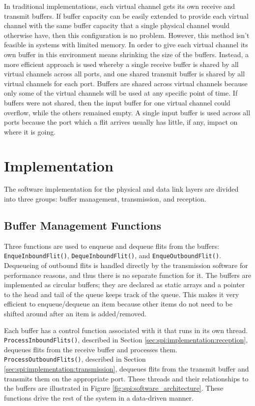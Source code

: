In traditional implementations, each virtual channel gets its own receive and transmit buffers. If buffer capacity can be easily extended to provide each virtual channel with the same buffer capacity that a single physical channel would otherwise have, then this configuration is no problem. However, this method isn't feasible in systems with limited memory. In order to give each virtual channel its own buffer in this environment means shrinking the size of the buffers. Instead, a more efficient approach is used whereby a single receive buffer is shared by all virtual channels across all ports, and one shared transmit buffer is shared by all virtual channels for each port. Buffers are shared across virtual channels because only some of the virtual channels will be used at any specific point of time. If buffers were not shared, then the input buffer for one virtual channel could overflow, while the others remained empty. A single input buffer is used across all ports because the port which a flit arrives usually has little, if any, impact on where it is going.

\section{Implementation}\label{sec:spi:implementation}

The software implementation for the physical and data link layers are divided into three groups: buffer management, transmission, and reception.

\subsection{Buffer Management Functions}\label{sec:spi:implementation:buffer_management_functions}

Three functions are used to enqueue and dequeue flits from the buffers: \lstinline$EnqueInboundFlit()$, \lstinline$DequeInboundFlit()$, and \lstinline$EnqueOutboundFlit()$. Dequeueing of outbound flits is handled directly by the transmission software for performance reasons, and thus there is no separate function for it. The buffers are implemented as circular buffers; they are declared as static arrays and a pointer to the head and tail of the queue keeps track of the queue. This makes it very efficient to enqueue/dequeue an item because other items do not need to be shifted around after an item is added/removed. 

Each buffer has a control function associated with it that runs in its own thread. \lstinline$ProcessInboundFlits()$, described in Section \ref{sec:spi:implementation:reception}, dequeues flits from the receive buffer and processes them. \lstinline$ProcessOutboundFlits()$, described in Section \ref{sec:spi:implementation:transmission}, dequeues flits from the transmit buffer and transmits them on the appropriate port. These threads and their relationships to the buffers are illustrated in Figure \ref{fig:spi:software_architecture}. These functions drive the rest of the system in a data-driven manner.

